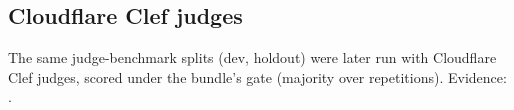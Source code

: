 \subsection{Cloudflare Clef judges}\label{sec:clef}
The same judge-benchmark splits (dev, holdout) were later run with Cloudflare Clef judges, scored under the bundle's gate (majority over repetitions). Evidence: .
\begin{table}[htbp]\centering\small\caption{Cloudflare Clef judges on the judge-benchmark splits.}\label{tab:clef}\end{table}
